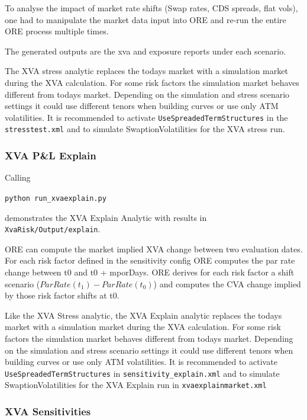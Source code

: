 To analyse the impact of market rate shifts (Swap rates, CDS spreads, flat vols), one had to
manipulate the market data input into ORE and re-run the entire ORE process multiple times.

The generated outputs are the xva and exposure reports under each scenario.

The XVA stress analytic replaces the todays market with a simulation market during the XVA calculation.
For some risk factors the simulation market behaves different from todays market.
Depending on the simulation and stress scenario settings it could use different tenors when building curves
or use only ATM volatilities. It is recommended to activate {\tt UseSpreadedTermStructures} in the
{\tt stresstest.xml} and to simulate SwaptionVolatilities for the XVA stress run.

\subsubsection{XVA P\&L Explain}\label{example:xvarisk_pnl}

Calling

\medskip
\centerline {\tt python run\_xvaexplain.py}

\medskip
demonstrates the XVA Explain Analytic with results in {\tt XvaRisk/Output/explain}.

ORE can compute the market implied XVA change between two evaluation dates.
For each risk factor defined in the sensitivity config ORE computes the par rate change between t0
and t0 + mporDays.  ORE derives for each risk factor a shift scenario ($ParRate(t_1) - ParRate(t_0)$)
and computes the CVA change implied by those risk factor shifts at t0.

Like the XVA Stress analytic,
the XVA Explain analytic replaces the todays market with a simulation market during the XVA calculation.
For some risk factors the simulation market behaves different from todays market.
Depending on the simulation and stress scenario settings it could use different tenors when building curves
or use only ATM volatilities. It is recommended to activate {\tt UseSpreadedTermStructures} in
{\tt sensitivity\_explain.xml} and to simulate SwaptionVolatilities for the XVA Explain run
in {\tt xvaexplainmarket.xml}

\subsubsection{XVA Sensitivities}\label{example:xvarisk_sensi}

